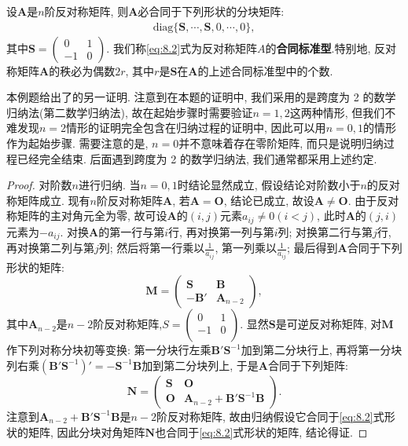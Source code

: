 \documentclass[../../main.tex]{subfiles}
\begin{document}
\begin{theorem}[反对称矩阵的合同标准型]\label{theorem:反对称矩阵的合同标准型}
设$\boldsymbol{A}$是$n$阶反对称矩阵, 则$\boldsymbol{A}$必合同于下列形状的分块矩阵:
\begin{align}
\text{diag}\{\boldsymbol{S}, \cdots, \boldsymbol{S}, 0, \cdots, 0\}, \label{eq:8.2}
\end{align}
其中$\boldsymbol{S}=\begin{pmatrix}
0 & 1 \\
-1 & 0
\end{pmatrix}$. 我们称\eqref{eq:8.2}式为反对称矩阵$A$的\textbf{合同标准型}.特别地, 反对称矩阵$\boldsymbol{A}$的秩必为偶数$2r$, 其中$r$是$\boldsymbol{S}$在$\boldsymbol{A}$的上述合同标准型中的个数.
\end{theorem}
\begin{remark}
本例题给出了的另一证明. 注意到在本题的证明中, 我们采用的是跨度为 2 的数学归纳法(第二数学归纳法), 故在起始步骤时需要验证$n = 1, 2$这两种情形, 但我们不难发现$n = 2$情形的证明完全包含在归纳过程的证明中, 因此可以用$n = 0, 1$的情形作为起始步骤. 需要注意的是, $n = 0$并不意味着存在零阶矩阵, 而只是说明归纳过程已经完全结束. 后面遇到跨度为 2 的数学归纳法, 我们通常都采用上述约定. 
\end{remark}
\begin{proof}
对阶数$n$进行归纳. 当$n = 0, 1$时结论显然成立, 假设结论对阶数小于$n$的反对称矩阵成立. 现有$n$阶反对称矩阵$\boldsymbol{A}$, 若$\boldsymbol{A}=\boldsymbol{O}$, 结论已成立, 故设$\boldsymbol{A}\neq\boldsymbol{O}$. 由于反对称矩阵的主对角元全为零, 故可设$\boldsymbol{A}$的$(i, j)$元素$a_{ij}\neq 0 (i < j)$, 此时$\boldsymbol{A}$的$(j, i)$元素为$-a_{ij}$. 对换$\boldsymbol{A}$的第一行与第$i$行, 再对换第一列与第$i$列; 对换第二行与第$j$行, 再对换第二列与第$j$列; 然后将第一行乘以$\frac{1}{a_{ij}}$, 第一列乘以$\frac{1}{a_{ij}}$; 最后得到$\boldsymbol{A}$合同于下列形状的矩阵:
\[
\boldsymbol{M}=\begin{pmatrix}
\boldsymbol{S} & \boldsymbol{B} \\
-\boldsymbol{B}' & \boldsymbol{A}_{n - 2}
\end{pmatrix},
\]
其中$\boldsymbol{A}_{n - 2}$是$n - 2$阶反对称矩阵,$S=\left( \begin{matrix}
0&		1\\
-1&		0\\
\end{matrix} \right) $. 显然$\boldsymbol{S}$是可逆反对称矩阵, 对$\boldsymbol{M}$作下列对称分块初等变换: 第一分块行左乘$\boldsymbol{B}'\boldsymbol{S}^{-1}$加到第二分块行上, 再将第一分块列右乘$(\boldsymbol{B}'\boldsymbol{S}^{-1})'=-\boldsymbol{S}^{-1}\boldsymbol{B}$加到第二分块列上, 于是$\boldsymbol{A}$合同于下列矩阵:
\[
\boldsymbol{N}=\begin{pmatrix}
\boldsymbol{S} & \boldsymbol{O} \\
\boldsymbol{O} & \boldsymbol{A}_{n - 2}+\boldsymbol{B}'\boldsymbol{S}^{-1}\boldsymbol{B}
\end{pmatrix}.
\]
注意到$\boldsymbol{A}_{n - 2}+\boldsymbol{B}'\boldsymbol{S}^{-1}\boldsymbol{B}$是$n - 2$阶反对称矩阵, 故由归纳假设它合同于\eqref{eq:8.2}式形状的矩阵, 因此分块对角矩阵$\boldsymbol{N}$也合同于\eqref{eq:8.2}式形状的矩阵, 结论得证.
\end{proof}
\end{document}
